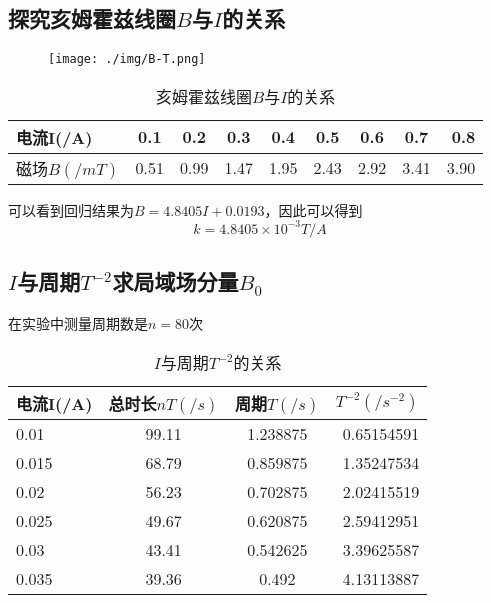 \documentclass{article}
\begin{document}
\subsection{探究亥姆霍兹线圈$B$与$I$的关系}

\begin{figure}[H]
    \centering
    \texttt{[image: ./img/B-T.png]}
\end{figure}

\begin{table}[!hbtp]
    \begin{center}
    \caption{亥姆霍兹线圈$B$与$I$的关系}
    \begin{tabular}{l|c|c|c|c|c|c|c|r}
        \textbf{电流I(/A)} & \textbf{0.1} & \textbf{0.2} & \textbf{0.3} & \textbf{0.4} & \textbf{0.5} & \textbf{0.6} & \textbf{0.7} & \textbf{0.8} \\
        \hline
        磁场$B(/mT)$ & 0.51 & 0.99 & 1.47 & 1.95 & 2.43 & 2.92 & 3.41 & 3.90\\
    \end{tabular}
    \end{center}
\end{table}

可以看到回归结果为$B=4.8405I+0.0193$，因此可以得到
\begin{equation}
    k=4.8405\times 10^{-3}T/A
\end{equation}

\subsection{$I$与周期$T^{-2}$求局域场分量$B_0$}
在实验中测量周期数是$n=80$次
\begin{table}[!hbtp]
    \begin{center}
    \caption{$I$与周期$T^{-2}$的关系}
    \begin{tabular}{l|c|c|r}
        \textbf{电流I(/A)} & \textbf{总时长$nT(/s)$} & \textbf{周期$T(/s)$} & \textbf{$T^{-2}(/s^{-2})$} \\
        \hline
        0.01 & 99.11 & 1.238875 & 0.65154591 \\
        \hline
        0.015 & 68.79 & 0.859875 & 1.35247534 \\
        \hline
        0.02 & 56.23 & 0.702875 & 2.02415519 \\
        \hline
        0.025 & 49.67 & 0.620875 & 2.59412951 \\
        \hline
        0.03 & 43.41 & 0.542625 & 3.39625587 \\
        \hline
        0.035 & 39.36 & 0.492 & 4.13113887 \\
    \end{tabular}
    \end{center}
\end{table}
\end{document}
